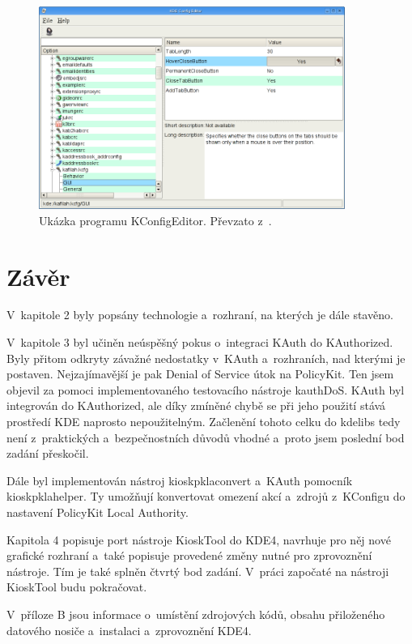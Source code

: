 \begin{figure}[h]
    \centering
    \includegraphics[width=10cm]{obrazky/kconfigeditor1.png}
    \caption{Ukázka programu KConfigEditor. Převzato z~\cite{KConfigEditor}.}
    \label{fig:kconfeditor}
\end{figure}

\chapter{Závěr}
V~kapitole 2 byly popsány technologie a~rozhraní, na kterých je dále stavěno.

V~kapitole 3 byl učiněn neúspěšný pokus o~integraci KAuth do KAuthorized. Byly přitom odkryty závažné nedostatky v~KAuth a~rozhraních, nad kterými je postaven. Nejzajímavější je pak Denial of Service útok na PolicyKit. Ten jsem objevil za pomoci implementovaného testovacího nástroje kauthDoS. KAuth byl integrován do KAuthorized, ale díky zmíněné chybě se při jeho použití stává prostředí KDE naprosto nepoužitelným. Začlenění tohoto celku do kdelibs tedy není z~praktických a~bezpečnostních důvodů vhodné a~proto jsem poslední bod zadání přeskočil.

Dále byl implementován nástroj kioskpklaconvert a~KAuth pomocník kioskpklahelper. Ty umožňují konvertovat omezení akcí a~zdrojů z~KConfigu do nastavení PolicyKit Local Authority.

Kapitola 4 popisuje port nástroje KioskTool do KDE4, navrhuje pro něj nové grafické rozhraní a~také popisuje provedené změny nutné pro zprovoznění nástroje. Tím je také splněn čtvrtý bod zadání. V~práci započaté na nástroji KioskTool budu pokračovat.

V~příloze B jsou informace o~umístění zdrojových kódů, obsahu přiloženého datového nosiče a~instalaci a~zprovoznění KDE4.

\appendix
